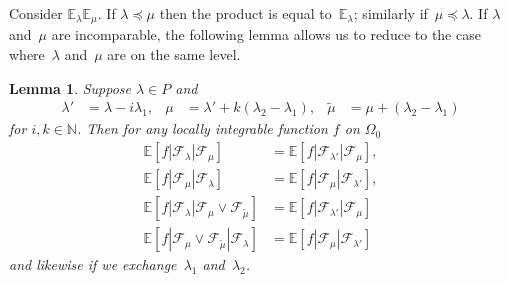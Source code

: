 \documentclass[a4paper]{amsart}
\newcommand{\EE}{\mathbb{E}}
\newcommand{\NN}{\mathbb{N}}
\theoremstyle{plain}
\newtheorem{lemma}[proposition]{Lemma}
\theoremstyle{definition}
\theoremstyle{remark}
\numberwithin{equation}{section}
\theoremstyle{plain}
\begin{document}
Consider $\EE_\lambda\EE_\mu$.  If $\lambda\preceq\mu$ then the
product is equal to~$\EE_\lambda$; similarly if~$\mu\preceq\lambda$.
If $\lambda$ and~$\mu$ are incomparable, the following lemma allows us
to reduce to the case where~$\lambda$ and~$\mu$ are on the same level.
\begin{lemma}
  \label{lem:3}
  Suppose $\lambda \in P$ and
  \begin{align*}
    \lambda' &= \lambda - i \lambda_1, &
    \mu &= \lambda' +  k(\lambda_2 - \lambda_1), &
    \tilde{\mu} &= \mu +(\lambda_2-\lambda_1)
  \end{align*}
  for $i, k \in \NN$. Then for any locally integrable function $f$ on
  $\Omega_0$
\begin{align}
  \label{eq:7.1}
  \EE[f | \mathcal{F}_\lambda | \mathcal{F}_\mu] &= \EE[f |
    \mathcal{F}_{\lambda'} | \mathcal{F}_\mu],\\
  \label{eq:7.2}
  \EE[f | \mathcal{F}_\mu | \mathcal{F}_\lambda] &= \EE[f |
    \mathcal{F}_\mu | \mathcal{F}_{\lambda'}],\\
  \label{eq:7.3}
  \EE[f | \mathcal{F}_{\lambda} | \mathcal{F}_\mu \vee
    \mathcal{F}_{\tilde{\mu}}] &= \EE[f | \mathcal{F}_{\lambda'} |
    \mathcal{F}_\mu]\\
  \label{eq:7.4}
  \EE[f | \mathcal{F}_\mu \vee \mathcal{F}_{\tilde{\mu}} |
    \mathcal{F}_\lambda] &= \EE[f | \mathcal{F}_\mu |
    \mathcal{F}_{\lambda'}]
\end{align}
and likewise if we exchange~$\lambda_1$ and~$\lambda_2$.
\end{lemma}
\end{document}
